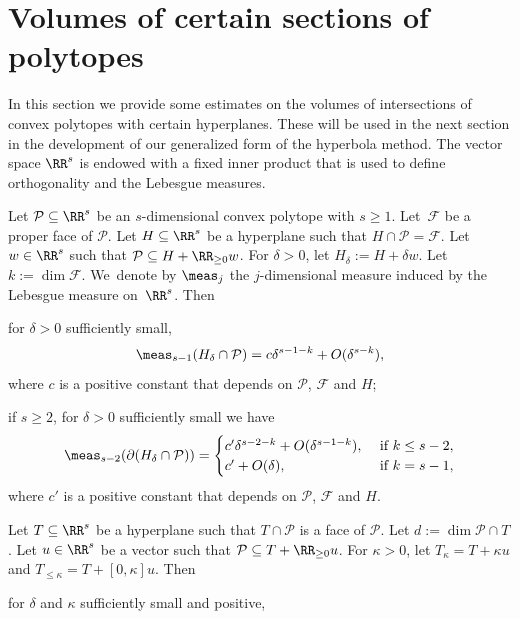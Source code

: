 \section{Volumes of certain sections of polytopes}
\label{sec:volume_section_polytope}
In this section we provide some estimates on the volumes of intersections
of convex polytopes with certain hyperplanes.
These will be used in the next section in the development of our generalized form of the hyperbola method.
The vector space $\RR^s$ is endowed with a fixed inner product that is used to define orthogonality and the Lebesgue measures.

\begin{prop}
\label{prop:volume_section_polytope}
Let $\mathcal P\subseteq \RR^s$ be an $s$-dimensional convex polytope with $s\geq1$.
Let~$\mathcal F$ be a proper face of $\mathcal P$.
Let $H\subseteq\RR^s$ be a hyperplane such that $H\cap \mathcal P=\mathcal F$.
Let~$w\in\nobreak\RR^s$ such that $\mathcal P\subseteq H+\RR_{\geq0}w$.
For $\delta> 0$, let $H_\delta:=H+\delta w$. Let $k:=\dim \mathcal F$.
We~denote by $\meas_j$ the $j$-dimensional measure
induced by the Lebesgue measure on~$\RR^s$. Then
\begin{enumeratei}
\item
\label{item:volume_s-1}
for $\delta>0$ sufficiently small,
\[
\meas_{s-1} (H_\delta \cap \mathcal P)=
c \delta^{s-1-k}+O(\delta^{s-k}),
\]
where $c$ is a positive constant that depends on $\mathcal P$, $\mathcal F$ and $H$;
\item
\label{item:volume_boundary}
if $s\geq 2$, for $\delta>0$ sufficiently small we have
\[
\meas_{s-2} (\partial(H_\delta \cap \mathcal P))= \begin{cases}
c' \delta^{s-2-k}+O(\delta^{s-1-k}), & \text{ if } k\leq s-2,\\
c' +O(\delta), & \text{ if } k= s-1,
\end{cases}
\]
where $c'$ is a positive constant that depends on $\mathcal P$, $\mathcal F$ and $H$.
\end{enumeratei}
Let $T\subseteq \RR^s$ be a hyperplane such that $T\cap \mathcal P$ is a face of $\mathcal P$. Let $d:=\dim\mathcal P\cap T$.
Let $u\in\RR^s$ be a vector such that $\mathcal P\subseteq T+\RR_{\geq0}u$.
For $\kappa>0$, let $T_\kappa=T+{\kappa}u$ and $T_{\leq\kappa}=T+[0,\kappa] u$. Then
\begin{enumeratei}\setcounter{enumi}{2}
\item
\label{item:volume_s-1_kappa}
for $\delta$ and $\kappa$ sufficiently small and positive,
\[
\]
\end{enumeratei}
\end{prop}
